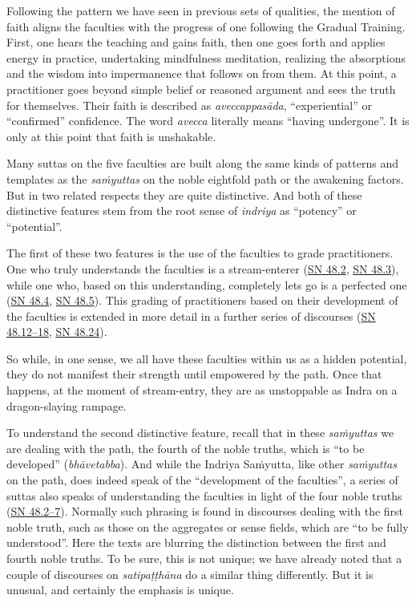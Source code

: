 \documentclass[12pt,openany]{book}%
\begin{document}
Following the pattern we have seen in previous sets of qualities, the mention of faith aligns the faculties with the progress of one following the Gradual Training. First, one hears the teaching and gains faith, then one goes forth and applies energy in practice, undertaking mindfulness meditation, realizing the absorptions and the wisdom into impermanence that follows on from them. At this point, a practitioner goes beyond simple belief or reasoned argument and sees the truth for themselves. Their faith is described as \textit{\textsanskrit{aveccappasāda}}, “experiential” or “confirmed” confidence. The word \textit{avecca} literally means “having undergone”. It is only at this point that faith is unshakable.

Many suttas on the five faculties are built along the same kinds of patterns and templates as the \textit{\textsanskrit{saṁyuttas}} on the noble eightfold path or the awakening factors. But in two related respects they are quite distinctive. And both of these distinctive features stem from the root sense of \textit{indriya} as “potency” or “potential”.

The first of these two features is the use of the faculties to grade practitioners. One who truly understands the faculties is a stream-enterer (\href{https://suttacentral.net/sn48.2}{SN 48.2}, \href{https://suttacentral.net/sn48.3}{SN 48.3}), while one who, based on this understanding, completely lets go is a perfected one (\href{https://suttacentral.net/sn48.4}{SN 48.4}, \href{https://suttacentral.net/sn48.5}{SN 48.5}). This grading of practitioners based on their development of the faculties is extended in more detail in a further series of discourses (\href{https://suttacentral.net/sn48.12}{SN 48.12–18}, \href{https://suttacentral.net/sn48.24}{SN 48.24}).

So while, in one sense, we all have these faculties within us as a hidden potential, they do not manifest their strength until empowered by the path. Once that happens, at the moment of stream-entry, they are as unstoppable as Indra on a dragon-slaying rampage.

To understand the second distinctive feature, recall that in these \textit{\textsanskrit{saṁyuttas}} we are dealing with the path, the fourth of the noble truths, which is “to be developed” (\textit{\textsanskrit{bhāvetabba}}). And while the Indriya \textsanskrit{Saṁyutta}, like other \textit{\textsanskrit{saṁyuttas}} on the path, does indeed speak of the “development of the faculties”, a series of suttas also speaks of understanding the faculties in light of the four noble truths (\href{https://suttacentral.net/sn48.2}{SN 48.2–7}). Normally such phrasing is found in discourses dealing with the first noble truth, such as those on the aggregates or sense fields, which are “to be fully understood”. Here the texts are blurring the distinction between the first and fourth noble truths. To be sure, this is not unique; we have already noted that a couple of discourses on \textit{\textsanskrit{satipaṭṭhāna}} do a similar thing differently. But it is unusual, and certainly the emphasis is unique.
\end{document}
